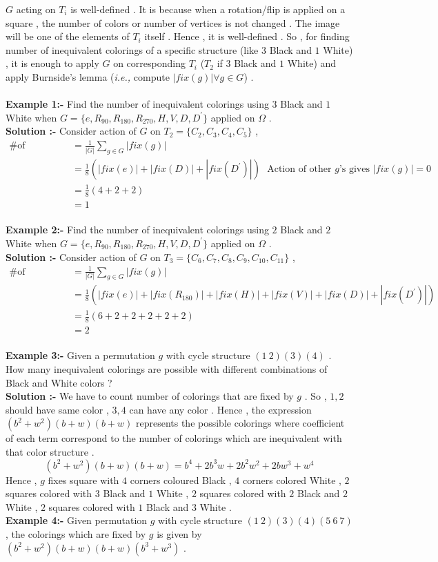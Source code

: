 \qquad $G$ acting on $T_i$ is well-defined . It is because when a rotation/flip is applied on a square , the number of colors or number of vertices is not changed . The image will be one of the elements of $T_i$ itself . Hence , it is well-defined . So , for finding number of inequivalent colorings of a specific structure (like $3$ Black and $1$ White) , it is enough to apply $G$ on corresponding $T_i$ ($T_2$ if $3$ Black and $1$ White) and apply Burnside's lemma (\textit{i.e.,} compute $|fix(g)| \forall g\in G$) .\\\\
\textbf{Example 1:-} Find the number of inequivalent colorings using $3$ Black and $1$ White when $G=\{e,R_{90},R_{180},R_{270},H,V,D,D^{\prime}\}$ applied on $\Omega$ . \\
\textbf{Solution :-} Consider action of $G$ on $T_2=\{C_2,C_3,C_4,C_5\}$ , 
\begin{align*}
    \textrm{\# of inequivalent colorings }&= \frac{1}{|G|}\sum_{g\in G}|fix(g)|\\
    &= \frac{1}{8}\left(|fix(e)|+|fix(D)|+|fix(D^{\prime})|\right)~~~\textrm{Action of other $g$'s gives $|fix(g)|=0$}\\
    &= \frac{1}{8}\left(4+2+2\right)\\
    &= 1
\end{align*}\\
\textbf{Example 2:-} Find the number of inequivalent colorings using $2$ Black and $2$ White when $G=\{e,R_{90},R_{180},R_{270},H,V,D,D^{\prime}\}$ applied on $\Omega$ . \\
\textbf{Solution :-} Consider action of $G$ on $T_3=\{C_6,C_7,C_8,C_9,C_{10},C_{11}\}$ , 
\begin{align*}
    \textrm{\# of inequivalent colorings }&= \frac{1}{|G|}\sum_{g\in G}|fix(g)|\\
    &= \frac{1}{8}\left(|fix(e)|+|fix(R_{180})|+|fix(H)|+|fix(V)|+|fix(D)|+|fix(D^{\prime})|\right)\\
    &= \frac{1}{8}\left(6+2+2+2+2+2\right)\\
    &= 2
\end{align*}\\
\textbf{Example 3:-} Given a permutation $g$ with cycle structure $(1~2)(3)(4)$ . How many inequivalent colorings are possible with different combinations of Black and White colors ?\\
\textbf{Solution :-} We have to count number of colorings that are fixed by $g$ . So , $1,2$ should have same color , $3,4$ can have any color . Hence , the expression $(b^2+w^2)(b+w)(b+w)$ represents the possible colorings where coefficient of each term correspond to the number of colorings which are inequivalent with that color structure . 
$$(b^2+w^2)(b+w)(b+w) = b^4+2b^3w+2b^2w^2+2bw^3+w^4$$
Hence , $g$ fixes square with $4$ corners coloured Black , $4$ corners colored White , $2$ squares colored with $3$ Black and $1$ White , $2$ squares colored with $2$ Black and $2$ White , $2$ squares colored with $1$ Black and $3$ White .\\
\textbf{Example 4:-} Given permutation $g$ with cycle structure $(1~2)(3)(4)(5~6~7)$ , the colorings which are fixed by $g$ is given by $(b^2+w^2)(b+w)(b+w)(b^3+w^3)$ .\\
